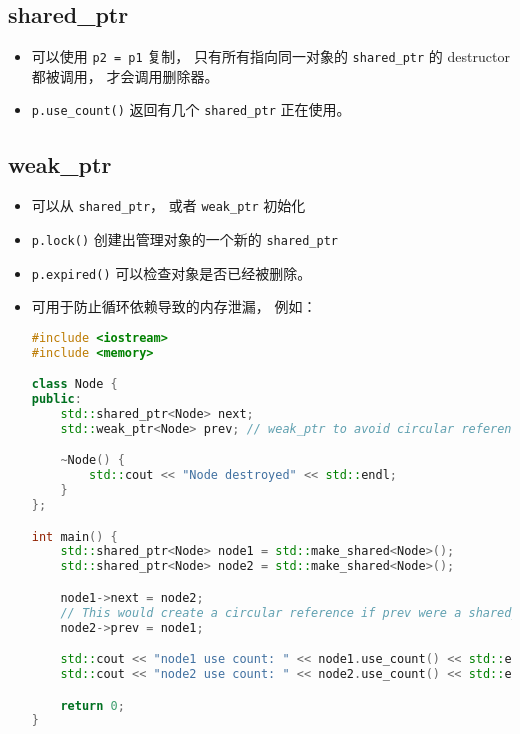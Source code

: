 \subsection{shared\_ptr}
\begin{itemize}
\item 可以使用 \verb`p2 = p1` 复制， 只有所有指向同一对象的 \verb`shared_ptr` 的 destructor 都被调用， 才会调用删除器。
\item \verb`p.use_count()` 返回有几个 \verb`shared_ptr` 正在使用。
\end{itemize}

\subsection{weak\_ptr}
\begin{itemize}
\item 可以从 \verb`shared_ptr`， 或者 \verb`weak_ptr` 初始化
\item \verb`p.lock()` 创建出管理对象的一个新的 \verb`shared_ptr`
\item \verb`p.expired()` 可以检查对象是否已经被删除。
\item 可用于防止循环依赖导致的内存泄漏， 例如：
\begin{lstlisting}[language=cpp]
#include <iostream>
#include <memory>

class Node {
public:
    std::shared_ptr<Node> next;
    std::weak_ptr<Node> prev; // weak_ptr to avoid circular reference

    ~Node() {
        std::cout << "Node destroyed" << std::endl;
    }
};

int main() {
    std::shared_ptr<Node> node1 = std::make_shared<Node>();
    std::shared_ptr<Node> node2 = std::make_shared<Node>();

    node1->next = node2;
    // This would create a circular reference if prev were a shared_ptr
    node2->prev = node1;

    std::cout << "node1 use count: " << node1.use_count() << std::endl;  // 1
    std::cout << "node2 use count: " << node2.use_count() << std::endl;  // 2

    return 0;
}
\end{lstlisting}
\end{itemize}
